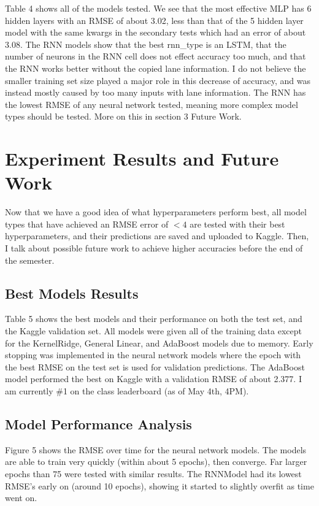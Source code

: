 \documentclass{article}
\begin{document}
Table 4 shows all of the models tested. We see that the most effective MLP has 6 hidden layers with an RMSE of about 3.02, less than that of the 5 hidden layer model with the same kwargs in the secondary tests which had an error of about 3.08. The RNN models show that the best rnn\_type is an LSTM, that the number of neurons in the RNN cell does not effect accuracy too much, and that the RNN works better without the copied lane information. I do not believe the smaller training set size played a major role in this decrease of accuracy, and was instead mostly caused by too many inputs with lane information. The RNN has the lowest RMSE of any neural network tested, meaning more complex model types should be tested. More on this in section 3 Future Work.

\section{Experiment Results and Future Work}

Now that we have a good idea of what hyperparameters perform best, all model types that have achieved an RMSE error of $<4$ are tested with their best hyperparameters, and their predictions are saved and uploaded to Kaggle. Then, I talk about possible future work to achieve higher accuracies before the end of the semester.

\subsection{Best Models Results}

Table 5 shows the best models and their performance on both the test set, and the Kaggle validation set. All models were given all of the training data except for the KernelRidge, General Linear, and AdaBoost models due to memory. Early stopping was implemented in the neural network models where the epoch with the best RMSE on the test set is used for validation predictions. The AdaBoost model performed the best on Kaggle with a validation RMSE of about 2.377. I am currently \#1 on the class leaderboard (as of May 4th, 4PM).

\subsection{Model Performance Analysis}

Figure 5 shows the RMSE over time for the neural network models. The models are able to train very quickly (within about 5 epochs), then converge. Far larger epochs than 75 were tested with similar results. The RNNModel had its lowest RMSE's early on (around 10 epochs), showing it started to slightly overfit as time went on.
\end{document}
